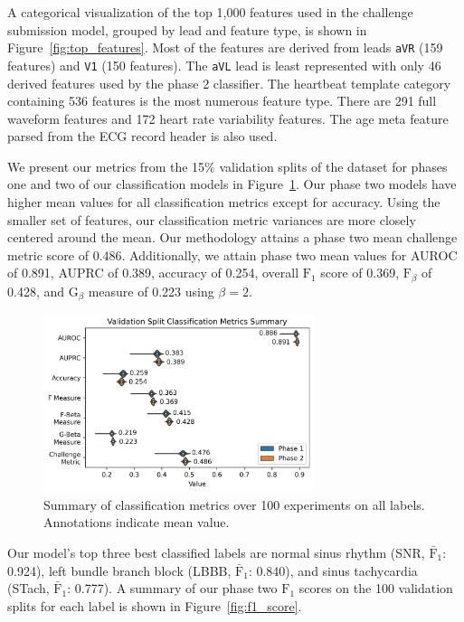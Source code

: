 \documentclass[twocolumn]{cinc}
\begin{document}
A categorical visualization of the top 1,000 features used in the challenge submission model, grouped by lead and feature type, is shown in Figure~\ref{fig:top_features}.
Most of the features are derived from leads \texttt{aVR} (159 features) and \texttt{V1} (150 features).
The \texttt{aVL} lead is least represented with only 46 derived features used by the phase 2 classifier.
The heartbeat template category containing 536 features is the most numerous feature type.
There are 291 full waveform features and 172 heart rate variability features.
The age meta feature parsed from the ECG record header is also used.

We present our metrics from the 15\% validation splits of the dataset for phases one and two of our classification models in Figure~\ref{fig:classification_metrics_summary}.
Our phase two models have higher mean values for all classification metrics except for accuracy.
Using the smaller set of features, our classification metric variances are more closely centered around the mean.
Our methodology attains a phase two mean challenge metric score of 0.486.
Additionally, we attain phase two mean values for AUROC of 0.891, AUPRC of 0.389, accuracy of 0.254, overall $\text{F}_1$ score of 0.369, $\text{F}_\beta$ of 0.428, and $\text{G}_\beta$ measure of 0.223 using $\beta = 2$.

\begin{figure}[hb]
  \centering
  \includegraphics[width=7.9cm]{fig/classification_metrics_phase_1_2.png}
  \caption{Summary of classification metrics over 100 experiments on all labels. Annotations indicate mean value.}
  \label{fig:classification_metrics_summary}
\end{figure}

Our model's top three best classified labels are normal sinus rhythm (SNR, $\bar{\text{F}}_1$: 0.924), left bundle branch block (LBBB, $\bar{\text{F}}_1$: 0.840), and sinus tachycardia (STach, $\bar{\text{F}}_1$: 0.777).
A summary of our phase two $\text{F}_1$ scores on the 100 validation splits for each label is shown in Figure~\ref{fig:f1_score}.
\end{document}

